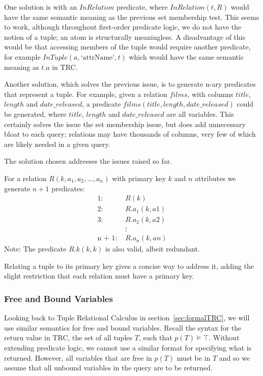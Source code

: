 \documentclass[a4paper, 11pt]{article}
\begin{document}
      One solution is with an $InRelation$ predicate, where $InRelation(t, R)$
      would have the same semantic meaning as the previous set membership test.
      This seems to work, although throughout first-order predicate logic, we
      do not have the notion of a tuple; an atom is structurally meaningless. A
      disadvantage of this would be that accessing members of the tuple would
      require another predicate, for example $InTuple(a, \text{`attrName'}, t)$
      which would have the same semantic meaning as $t.a$ in TRC.

      Another solution, which solves the previous issue, is to generate n-ary
      predicates that represent a tuple. For example, given a relation $films$,
      with columns $title$, $length$ and $date\_released$, a predicate
      $films(title, length, date\_released)$ could be generated, where $title$,
      $length$ and $date\_released$ are all variables. This certainly solves the
      issue the set membership issue, but does add unnecessary bloat to each
      query; relations may have thousands of columns, very few of which are
      likely needed in a given query.

      The solution chosen addresses the issues raised so far.

      For a relation $R(k, a_{1}, a_{2}, ..., a_{n})$ with primary key $k$
      and $n$ attributes we generate $n + 1$ predicates:
      \begin{align*}
        \text{1:  }      & R(k)           \\
        \text{2:  }      & R.a_1(k, a1)   \\
        \text{3:  }      & R.a_2(k, a2)   \\
                         & \vdots         \\
        \text{n + 1:  }  & R.a_n(k, an)
      \end{align*}
      Note: The predicate $R.k(k, k)$ is also valid, albeit redundant.

      Relating a tuple to its primary key gives a concise way to address it,
      adding the slight restriction that each relation must have a primary key.

    \subsubsection{Free and Bound Variables}
      \label{sec:freebound}
      Looking back to Tuple Relational Calculus in section~\ref{sec:formalTRC},
      we will use similar semantics for free and bound variables. Recall the
      syntax for the return value in TRC, the set of all tuples $T$, such that
      $p(T) \models \top$. Without extending predicate logic, we cannot use a
      similar format for specifying what is returned. However, all variables
      that are free in $p(T)$ must be in $T$ and so we assume that all unbound
      variables in the query are to be returned.
\end{document}

